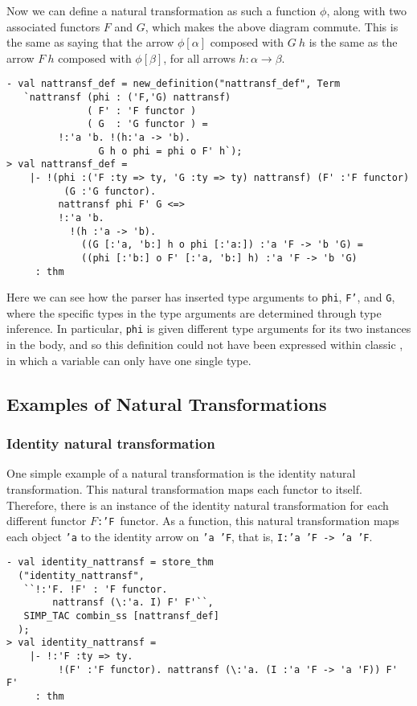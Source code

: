 Now we can define a natural transformation as such a function $\phi$, along with
two associated functors $F$ and $G$, which makes the above diagram commute.
This is the same as saying that the arrow $\phi[\alpha]$ composed with $G~h$ is the same as
the arrow $F~h$ composed with $\phi[\beta]$, for all arrows $h : \alpha \rightarrow \beta$.
\begin{session}
\begin{verbatim}
- val nattransf_def = new_definition("nattransf_def", Term
   `nattransf (phi : ('F,'G) nattransf)
              ( F' : 'F functor )
              ( G  : 'G functor ) =
         !:'a 'b. !(h:'a -> 'b).
                G h o phi = phi o F' h`);
> val nattransf_def =
    |- !(phi :('F :ty => ty, 'G :ty => ty) nattransf) (F' :'F functor)
          (G :'G functor).
         nattransf phi F' G <=>
         !:'a 'b.
           !(h :'a -> 'b).
             ((G [:'a, 'b:] h o phi [:'a:]) :'a 'F -> 'b 'G) =
             ((phi [:'b:] o F' [:'a, 'b:] h) :'a 'F -> 'b 'G)
     : thm
\end{verbatim}
\end{session}
Here we can see how the parser has inserted type arguments to \texttt{phi},
\texttt{F'}, and \texttt{G}, where the specific types in the type arguments
are determined through type inference. In particular, \texttt{phi} is given
different type arguments for its two instances in the body, and so this definition
could not have been expressed within classic \HOL{}, in which a variable
can only have one single type.

\subsection{Examples of Natural Transformations}

\subsubsection{Identity natural transformation}

One simple example of a natural transformation is the identity natural 
transformation. This natural transformation maps each functor to itself.
Therefore, there is an instance of the identity natural transformation for 
each different functor $F$\texttt{:'F}~{\sf functor}. As a function, this 
natural transformation maps each object \texttt{'a} to the 
identity arrow on \texttt{'a~'F}, that is, \texttt{I:'a~'F -> 'a~'F}.
\begin{session}
\begin{verbatim}
- val identity_nattransf = store_thm
  ("identity_nattransf",
   ``!:'F. !F' : 'F functor.
        nattransf (\:'a. I) F' F'``,
   SIMP_TAC combin_ss [nattransf_def]
  );
> val identity_nattransf =
    |- !:'F :ty => ty.
         !(F' :'F functor). nattransf (\:'a. (I :'a 'F -> 'a 'F)) F' F'
     : thm
\end{verbatim}
\end{session}

